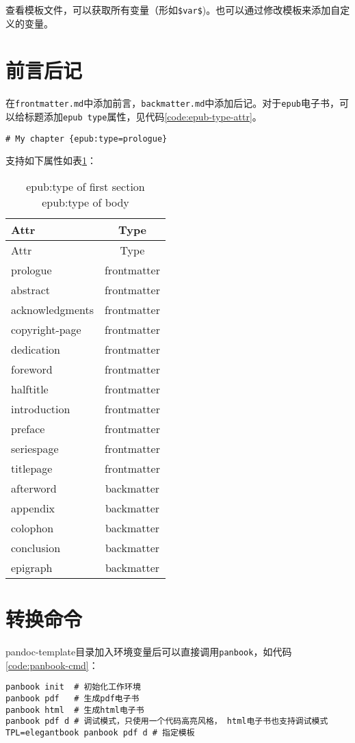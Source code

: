 \documentclass[cn]{elegantbook}
\newcommand{\passthrough}[1]{#1}
\begin{document}
查看模板文件，可以获取所有变量（形如\passthrough{\lstinline!$var$!})。也可以通过修改模板来添加自定义的变量。

\hypertarget{ux524dux8a00ux540eux8bb0}{%
\section{前言后记}\label{ux524dux8a00ux540eux8bb0}}

在\passthrough{\lstinline!frontmatter.md!}中添加前言，\passthrough{\lstinline!backmatter.md!}中添加后记。对于\passthrough{\lstinline!epub!}电子书，可以给标题添加\passthrough{\lstinline!epub type!}属性，见代码\ref{code:epub-type-attr}。

\begin{lstlisting}[label=code:epub-type-attr, caption=code:epub-type-attr, float=htbp]
# My chapter {epub:type=prologue}
\end{lstlisting}

支持如下属性如表\ref{table:epub-type-attr}：

\begin{longtable}[]{@{}lc@{}}
\caption{epub:type of first section epub:type of
body\label{table:epub-type-attr}}\tabularnewline
\toprule
Attr & Type\tabularnewline
\midrule
\endfirsthead
\toprule
Attr & Type\tabularnewline
\midrule
\endhead
prologue & frontmatter\tabularnewline
abstract & frontmatter\tabularnewline
acknowledgments & frontmatter\tabularnewline
copyright-page & frontmatter\tabularnewline
dedication & frontmatter\tabularnewline
foreword & frontmatter\tabularnewline
halftitle & frontmatter\tabularnewline
introduction & frontmatter\tabularnewline
preface & frontmatter\tabularnewline
seriespage & frontmatter\tabularnewline
titlepage & frontmatter\tabularnewline
afterword & backmatter\tabularnewline
appendix & backmatter\tabularnewline
colophon & backmatter\tabularnewline
conclusion & backmatter\tabularnewline
epigraph & backmatter\tabularnewline
\bottomrule
\end{longtable}

\hypertarget{ux8f6cux6362ux547dux4ee4}{%
\section{转换命令}\label{ux8f6cux6362ux547dux4ee4}}

pandoc-template目录加入环境变量后可以直接调用\passthrough{\lstinline!panbook!}，如代码\ref{code:panbook-cmd}：

\begin{lstlisting}[caption=转换命令, label=code:panbook-cmd, float=htbp]
panbook init  # 初始化工作环境
panbook pdf   # 生成pdf电子书
panbook html  # 生成html电子书
panbook pdf d # 调试模式，只使用一个代码高亮风格， html电子书也支持调试模式
TPL=elegantbook panbook pdf d # 指定模板
\end{lstlisting}
\end{document}
